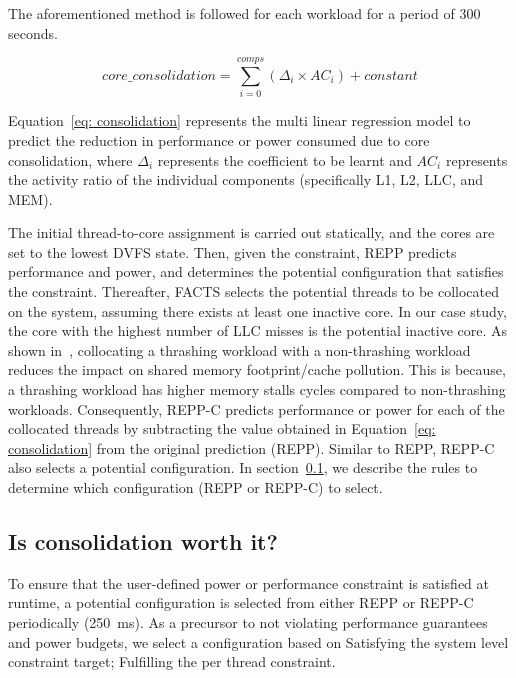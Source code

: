 The aforementioned method is followed for each workload for a period of 300 seconds.

\begin{equation}%
    \label{eq: consolidation}
     core\_consolidation = \sum_{i=0}^{comps}(\Delta_{\mathit{i}} \times AC_{\mathit{i}}) + constant
\end{equation}

Equation~\ref{eq: consolidation} represents the multi linear regression model to predict
the reduction in performance or power consumed due to core consolidation, where
$\Delta_{\mathit{i}}$ represents the coefficient to be learnt and
\textit{$AC_{\mathit{i}}$} represents the activity ratio of the individual components
(specifically L1, L2, LLC, and MEM).


 The initial thread-to-core assignment is carried out statically, and the
cores are set to the lowest DVFS state. Then, given the constraint, REPP predicts
performance and power, and determines the potential configuration that satisfies the
constraint.  Thereafter, FACTS selects the potential threads to be collocated on the
system, assuming there exists at least one inactive core. In our case study, the core with
the highest number of LLC misses is the potential inactive core.  As shown
in~\citep{Blagodurov:2010:CSM:1880018.1880019}, collocating a thrashing workload with a
non-thrashing workload reduces the impact on shared memory footprint/cache pollution.
This is because, a thrashing workload has higher memory stalls cycles compared to
non-thrashing workloads. Consequently, REPP-C predicts performance or power for each of
the collocated threads by subtracting the value obtained in Equation~\ref{eq:
consolidation} from the original prediction (REPP).  Similar to REPP, REPP-C also selects
a potential configuration.  In section~\ref{subsec: repporreppc}, we describe the rules to
determine which configuration (REPP or REPP-C) to select.


\subsection{Is consolidation worth it?}
\label{subsec: repporreppc}

To ensure that the user-defined power or performance constraint is satisfied at runtime, a
potential configuration is selected from either REPP or REPP-C periodically
(\SI{250}{\milli\second}). As a precursor to not violating performance guarantees and
power budgets, we select a configuration based on {\small {}} Satisfying the
system level constraint target; {\small {}} Fulfilling the per thread constraint.

